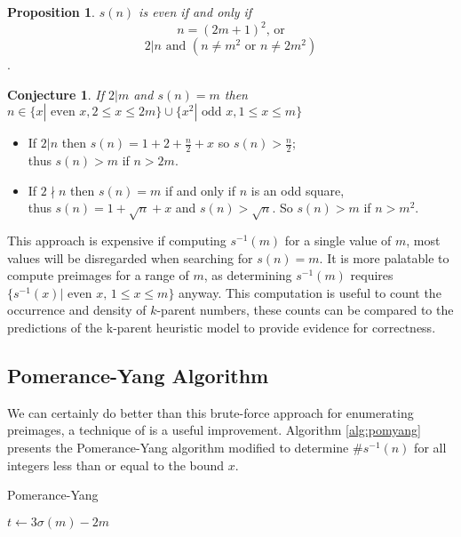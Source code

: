 \documentclass{article}
\theoremstyle{definition}
\newtheorem{conjecture}{Conjecture}[section]
\newtheorem{proposition}{Proposition}[section]
\begin{document}
\begin{proposition} \textit{$s(n)$ is even if and only if}
    $$n = (2m+1)^2 \text{, or}$$
    $$2 | n \text{ and } (n \neq m^2 \text{ or } n \neq 2m^2)$$.
\end{proposition}
\pagebreak
\begin{conjecture} \textit{If $2 | m$ and $s(n) = m$ then $n \in \{x| \text{ even } x, 2 \leq x \leq 2m \} \cup \{x^2| \text{ odd } x, 1 \leq x \leq m\}$}
    \begin{itemize}
        \item If $2 | n$ then $s(n) = 1+ 2 + \frac{n}{2} + x $ so $s(n) > \frac{n}{2}$;\\
              thus $s(n) > m$ if $n > 2m$.

        \item If $2 \nmid n$ then $s(n) = m$ if and only if $n$ is an odd square,\\
              thus $s(n) = 1 + \sqrt{n} + x$ and $s(n) > \sqrt{n}$. So $s(n) > m$ if $n > m^2$.

    \end{itemize}
\end{conjecture}



This approach is expensive if computing $s^{-1}(m)$ for a single value of $m$, most values will be disregarded when searching for $s(n) = m$. It is more palatable to compute preimages for a range of $m$, as determining $s^{-1}(m)$ requires $\{s^{-1}(x)|\text{ even } x,\, 1 \leq x \leq m\}$ anyway. This computation is useful to count the occurrence and density of $k$-parent numbers, these counts can be compared to the predictions of the k-parent heuristic model to provide evidence for correctness.

\subsection{Pomerance-Yang Algorithm}
We can certainly do better than this brute-force approach for enumerating preimages, a technique of \cite{pomYang} is a useful improvement. Algorithm \ref{alg:pomyang} presents the Pomerance-Yang algorithm modified to determine $\#s^{-1}(n)$ for all integers less than or equal to the bound $x$.

\begin{algorithm}[H]
    \caption{Pomerance-Yang}
    \label{alg:pomyang}
    \begin{algorithmic}[1]
        \State $t \gets 3\sigma(m) - 2m$
        \EndWhile
        \EndIf
         
        \EndIf
        \EndFor
        \ForAll{odd composite $m \in [1, x^{2/3})$}
        \EndIf
        \EndFor
        \EndProcedure
    \end{algorithmic}
\end{algorithm}
\end{document}
